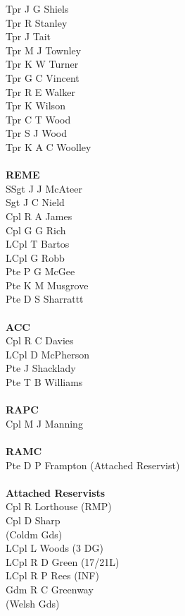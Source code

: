 \begin{multicols}{4}
  Tpr J G Shiels \\
  Tpr R Stanley \\
  Tpr J Tait \\
  Tpr M J Townley \\
  Tpr K W Turner \\
  Tpr G C Vincent \\
  Tpr R E Walker \\
  Tpr K Wilson \\
  Tpr C T Wood \\
  Tpr S J Wood \\
  Tpr K A C Woolley \\
  \\
  \textbf{REME} \\
  SSgt J J McAteer \\
  Sgt J C Nield \\
  Cpl R A James \\
  Cpl G G Rich \\
  LCpl T Bartos \\
  LCpl G Robb \\
  Pte P G McGee \\
  Pte K M Musgrove \\
  Pte D S Sharrattt \\
  \\
  \textbf{ACC} \\
  Cpl R C Davies \\
  LCpl D McPherson \\
  Pte J Shacklady \\
  Pte T B Williams \\
  \\
  \textbf{RAPC} \\
  Cpl M J Manning \\
  \\
  \textbf{RAMC} \\
  Pte D P Frampton (Attached Reservist) \\
  \\
  \textbf{Attached Reservists} \\
  Cpl R Lorthouse (RMP) \\
  Cpl D Sharp \\ \indent (Coldm Gds) \\
  LCpl L Woods (3 DG) \\
  LCpl R D Green (17/21L) \\
  LCpl R P Rees (INF) \\
  Gdm R C Greenway \\ \indent (Welsh Gds) \\

\end{multicols}
